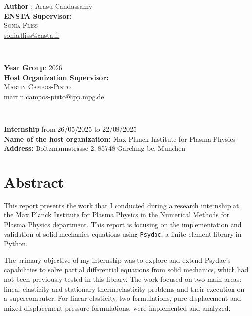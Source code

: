 \documentclass[a4paper,12pt,twoside]{report}
\begin{document}
\begin{minipage}[t]{0.5\textwidth}
	\begin{flushleft} 
    \textbf{Author} : Arasu Candassamy \\
    \vspace{1cm}
	\textbf{ENSTA Supervisor:}\\
	\textsc{Sonia Fliss}\\
	\href{mailto:sonia.fliss@ensta.fr}{sonia.fliss@ensta.fr}
	\end{flushleft}
\end{minipage}
~
\begin{minipage}[t]{0.4\textwidth}
	\begin{flushright} 
    \textbf{Year Group}: 2026 \\
    \vspace{1cm}
	\textbf{Host Organization Supervisor:}\\
	\textsc{Martin Campos-Pinto}\\
	\href{mailto:martin.campos-pinto@ipp.mpg.de}{martin.campos-pinto@ipp.mpg.de}\\
	\end{flushright}
\end{minipage} \\

\vspace{1cm}

\begin{center}
    \textbf{Internship} from 26/05/2025 to 22/08/2025\\
\textbf{Name of the host organization:} Max Planck Institute for Plasma Physics\\
\textbf{Address:} Boltzmannstrasse 2, 85748 Garching bei München
\end{center}


\newpage\null

\newpage
\section*{Abstract}

This report presents the work that I conducted during a research internship at the Max Planck Institute for Plasma Physics in the Numerical Methods for Plasma Physics department. This report is focusing on the implementation and validation of solid mechanics equations using \texttt{Psydac}, a finite element library in Python.

The primary objective of my internship was to explore and extend Psydac's capabilities to solve partial differential equations from solid mechanics, which had not been previously tested in this library. The work focused on two main areas: linear elasticity and stationary thermoelasticity problems and their execution on a supercomputer. For linear elasticity, two formulations, pure displacement and mixed displacement-pressure formulations, were implemented and analyzed. 
\end{document}
